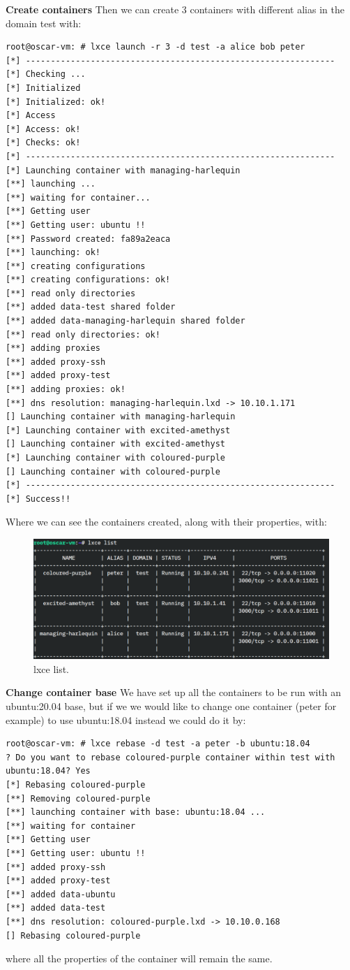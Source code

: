 \newpage
\textbf{Create containers}
Then we can create 3 containers with different alias in the domain test with:
\begin{verbatim}
root@oscar-vm: # lxce launch -r 3 -d test -a alice bob peter 
[*] --------------------------------------------------------------
[*] Checking ...
[*] Initialized
[*] Initialized: ok!
[*] Access
[*] Access: ok!
[*] Checks: ok!
[*] --------------------------------------------------------------
[*] Launching container with managing-harlequin
[**] launching ...
[**] waiting for container...
[**] Getting user
[**] Getting user: ubuntu !!
[**] Password created: fa89a2eaca
[**] launching: ok!
[**] creating configurations
[**] creating configurations: ok!
[**] read only directories
[**] added data-test shared folder
[**] added data-managing-harlequin shared folder
[**] read only directories: ok!
[**] adding proxies
[**] added proxy-ssh
[**] added proxy-test
[**] adding proxies: ok!
[**] dns resolution: managing-harlequin.lxd -> 10.10.1.171
[] Launching container with managing-harlequin
[*] Launching container with excited-amethyst
[] Launching container with excited-amethyst
[*] Launching container with coloured-purple
[] Launching container with coloured-purple
[*] --------------------------------------------------------------
[*] Success!!
\end{verbatim}
Where we can see the containers created, along with their properties, with:

\begin{figure}[H]
\label{fig:lxce list}
\centering
\includegraphics[width=\textwidth]{img/04/lxce-list.pdf}
\caption[Prototype setup]{\footnotesize{lxce list.}}
\end{figure}


\textbf{Change container base}
We have set up all the containers to be run with an ubuntu:20.04 base, but if we we would like to change one container (peter for example) to use ubuntu:18.04 instead we could do it by:
\begin{verbatim}
root@oscar-vm: # lxce rebase -d test -a peter -b ubuntu:18.04
? Do you want to rebase coloured-purple container within test with ubuntu:18.04? Yes
[*] Rebasing coloured-purple
[**] Removing coloured-purple
[**] launching container with base: ubuntu:18.04 ...
[**] waiting for container
[**] Getting user
[**] Getting user: ubuntu !!
[**] added proxy-ssh
[**] added proxy-test
[**] added data-ubuntu
[**] added data-test
[**] dns resolution: coloured-purple.lxd -> 10.10.0.168
[] Rebasing coloured-purple
\end{verbatim}
where all the properties of the container will remain the same.

